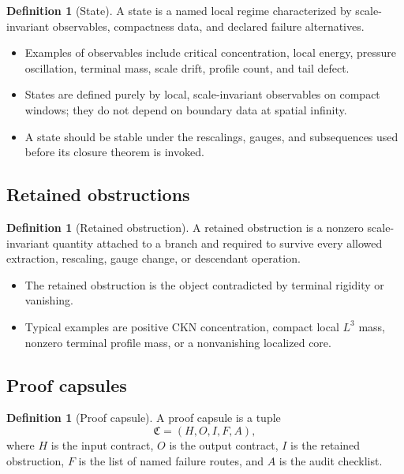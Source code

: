 \documentclass[11pt]{article}
\theoremstyle{plain}
\theoremstyle{definition}
\newtheorem{definition}[theorem]{Definition}
\theoremstyle{remark}
\newcommand{\capsule}{\mathfrak C}
\begin{document}
\begin{definition}[State]
A state is a named local regime characterized by scale-invariant observables, compactness data, and declared failure alternatives.
\end{definition}

\begin{itemize}
  \item Examples of observables include critical concentration, local energy, pressure oscillation, terminal mass, scale drift, profile count, and tail defect.
  \item States are defined purely by local, scale-invariant observables on compact windows; they do not depend on boundary data at spatial infinity.
  \item A state should be stable under the rescalings, gauges, and subsequences used before its closure theorem is invoked.
\end{itemize}

\subsection{Retained obstructions}
\begin{definition}[Retained obstruction]
A retained obstruction is a nonzero scale-invariant quantity attached to a branch and required to survive every allowed extraction, rescaling, gauge change, or descendant operation.
\end{definition}

\begin{itemize}
  \item The retained obstruction is the object contradicted by terminal rigidity or vanishing.
  \item Typical examples are positive CKN concentration, compact local $L^3$ mass, nonzero terminal profile mass, or a nonvanishing localized core.
\end{itemize}

\subsection{Proof capsules}
\begin{definition}[Proof capsule]
A proof capsule is a tuple
\[
  \capsule=(H,O,I,F,A),
\]
where $H$ is the input contract, $O$ is the output contract, $I$ is the retained obstruction, $F$ is the list of named failure routes, and $A$ is the audit checklist.
\end{definition}
\end{document}
